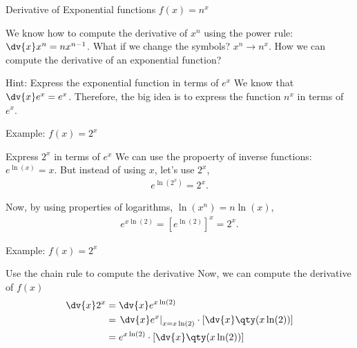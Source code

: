 \documentclass[../tufte-style.tex]{standalone}
\begin{document}
\date{February 26, 2026}

\begin{frame}{Derivative of Exponential functions \(f(x) = n^x\)}

    We know how to compute the derivative of \(x^n\) using the power rule: \(\dv{x}x^{n} = nx^{n-1}\).
    What if we change the symbols? \(x^n\to n^{x}\).
    How we can compute the derivative of an exponential function?

    \vspace{2em}

    \begin{block}{Hint: Express the exponential function in terms of \(e^x\)}
        We know that \(\dv{x}e^x = e^x\).
        Therefore, the big idea is to express the function $n^x$ in terms of $e^x$.
    \end{block}

\end{frame}

\begin{frame}{Example: \(f(x)=2^x\)}

    \begin{block}{Express \(2^x\) in terms of \(e^x\)}
        We can use the propoerty of inverse functions: \(e^{\ln(x)} = x\).
        But instead of using $x$, let's use \(2^x\),
        \begin{gather*}
            e^{\ln(2^x)} = 2^x.
        \end{gather*}
        
        Now, by using properties of logarithms, \(\ln(x^n) = n\ln(x)\),
        \begin{gather*}
            e^{x\ln(2)} = \left[e^{\ln(2)}\right]^{x} = 2^x.
        \end{gather*}
    \end{block}

\end{frame}

\begin{frame}{Example: \(f(x)=2^x\)}

    \begin{block}{Use the chain rule to compute the derivative}
        Now, we can compute the derivative of \(f(x)\) 
        \begin{align*}
            \dv{x}2^{x} &= \dv{x}e^{x\ln(2)} \\
                        &= \left.\dv{x}e^{x} \right|_{x=x\ln(2)}\cdot\left[\dv{x}\qty(x\ln(2))\right] \\
                        &= e^{x\ln(2)}\cdot\left[\dv{x}\qty(x\ln(2))\right]
        \end{align*}
    \end{block}

\end{frame}
\end{document}
